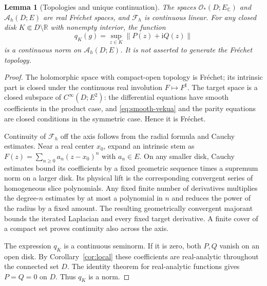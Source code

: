 \documentclass[11pt,a4paper]{article}
\numberwithin{equation}{section}
\newtheorem{lemma}[theorem]{Lemma}
\theoremstyle{definition}
\theoremstyle{remark}
\newcommand{\R}{\mathbb R}
\newcommand{\C}{\mathbb C}
\newcommand{\ii}{\mathrm i}
\newcommand{\Hol}{\mathcal O}
\newcommand{\A}{\mathcal A_h}
\newcommand{\Fu}{\mathcal F_h}
\newcommand{\norm}[1]{\left\lVert#1\right\rVert}
\begin{document}
\begin{lemma}[Topologies and unique continuation]\label{lem:Frechet}
The spaces $\Hol_*(D;E_\C)$ and $\A(D;E)$ are real Fr\'echet spaces, and
$\Fu$ is continuous linear. For any closed disk $K\Subset D\setminus\R$
with nonempty interior, the function
\begin{equation}\label{eq:continuous-norm}
 q_K(g)=\sup_{z\in K}\norm{P(z)+\ii Q(z)}
\end{equation}
is a continuous norm on $\A(D;E)$. It is not asserted to generate the
Fr\'echet topology.
\end{lemma}
\begin{proof}
The holomorphic space with compact-open topology is Fr\'echet; its intrinsic
part is closed under the continuous real involution $F\mapsto F^\sharp$.
The target space is a closed subspace of $C^\infty(D;E^2)$: the differential
equations have smooth coefficients in the product case, and
\eqref{eq:smooth-vekua} and the parity equations are closed conditions in the
symmetric case. Hence it is Fr\'echet.

Continuity of $\Fu$ off the axis follows from the radial formula and Cauchy
estimates. Near a real center $x_0$, expand an intrinsic stem as
$F(z)=\sum_{n\ge0}a_n(z-x_0)^n$ with $a_n\in E$. On any smaller disk,
Cauchy estimates bound its coefficients by a fixed geometric sequence times
a supremum norm on a larger disk. Its physical lift is the corresponding
convergent series of homogeneous slice polynomials. Any fixed finite number
of derivatives multiplies the degree-$n$ estimates by at most a polynomial
in $n$ and reduces the power of the radius by a fixed amount. The resulting
geometrically convergent majorant bounds the iterated Laplacian and every
fixed target derivative. A finite cover of a compact set proves continuity
also across the axis.

The expression $q_K$ is a continuous seminorm. If it is zero, both $P,Q$
vanish on an open disk. By Corollary~\ref{cor:local} these coefficients are
real-analytic throughout the connected set $D$. The identity theorem for
real-analytic functions gives $P=Q=0$ on $D$. Thus $q_K$ is a norm.
\end{proof}
\end{document}
